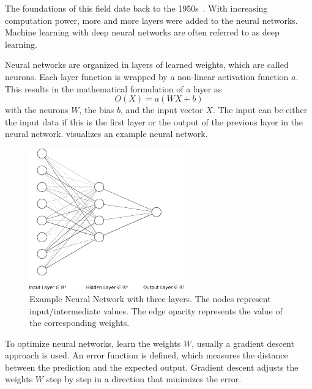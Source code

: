 The foundations of this field date back to the 1950s~\cite{rosenblatt1958perceptron}.
With increasing computation power, more and more layers were added to the neural networks.
Machine learning with deep neural networks are often referred to as deep learning.

Neural networks are organized in layers of learned weights, which are called neurons.
Each layer function is wrapped by a non-linear activation function $a$.
This results in the mathematical formulation of a layer as
\begin{equation}
    O(X) = a(WX+b)
\end{equation}
with the neurons $W$, the bias $b$, and the input vector $X$.
The input can be either the input data if this is the first layer or the output of the previous layer in the neural network.
 visualizes an example neural network.
\begin{figure}
    \centering
    \includegraphics[width=0.6\textwidth]{img/example_text_nn-crop.pdf}
    \caption{Example Neural Network with three layers. 
    The nodes represent input/intermediate values.
    The edge opacity represents the value of the corresponding weights.}
    \label{fig:bg:nn-example}
\end{figure}

To optimize neural networks, \ie learn the weights $W$, usually a gradient descent approach is used.
An error function is defined, which measures the distance between the prediction and the expected output.
Gradient descent adjusts the weights $W$ step by step in a direction that minimizes the error.
